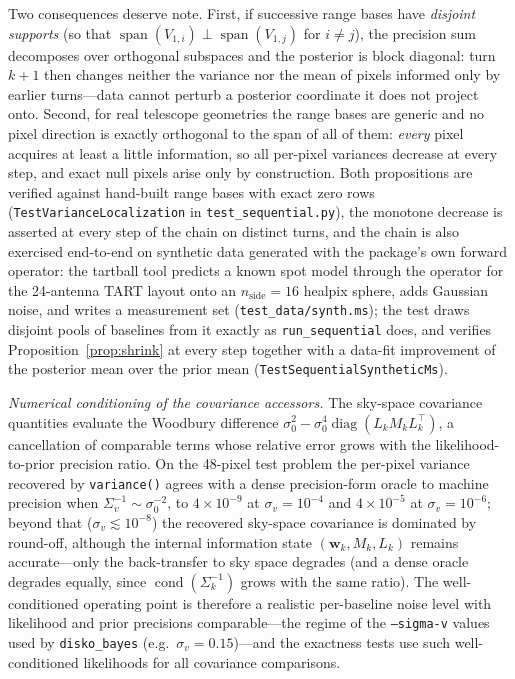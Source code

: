 \documentclass[11pt,a4paper]{article}
\begin{document}
Two consequences deserve note. First, if successive range bases have
\emph{disjoint supports} (so that
$\operatorname{span}(V_{1,i})\perp\operatorname{span}(V_{1,j})$ for $i\neq j$),
the precision sum decomposes over orthogonal subspaces and the posterior is
block diagonal: turn $k+1$ then changes neither the variance nor the mean of
pixels informed only by earlier turns---data cannot perturb a posterior
coordinate it does not project onto. Second, for real telescope geometries the
range bases are generic and no pixel direction is exactly orthogonal to the
span of all of them: \emph{every} pixel acquires at least a little
information, so all per-pixel variances decrease at every step, and exact
null pixels arise only by construction. Both propositions are verified against
hand-built range bases with exact zero rows
(\texttt{TestVarianceLocalization} in \texttt{test\_sequential.py}), the
monotone decrease is asserted at every step of the chain on distinct turns,
and the chain is also exercised end-to-end on synthetic data generated with
the package's own forward operator: the tartball tool \cite{tartball}
predicts a known spot model through the operator for the 24-antenna TART
layout onto an $n_\mathrm{side}=16$ healpix sphere, adds Gaussian noise, and
writes a measurement set (\texttt{test\_data/synth.ms}); the test draws
disjoint pools
of baselines from it exactly as \texttt{run\_sequential} does, and verifies
Proposition~\ref{prop:shrink} at every step together with a data-fit
improvement of the posterior mean over the prior mean
(\texttt{TestSequentialSyntheticMs}).

\emph{Numerical conditioning of the covariance accessors.} The sky-space
covariance quantities evaluate the Woodbury difference
$\sigma_0^2-\sigma_0^4\operatorname{diag}(L_kM_kL_k^{\!\top})$, a
cancellation of comparable terms whose relative error grows with the
likelihood-to-prior precision ratio. On the 48-pixel test problem the
per-pixel variance recovered by \texttt{variance()} agrees with a dense
precision-form oracle to machine precision when
$\Sigma_v^{-1}\sim\sigma_0^{-2}$, to $4\times10^{-9}$ at
$\sigma_v=10^{-4}$ and $4\times10^{-5}$ at $\sigma_v=10^{-6}$; beyond that
($\sigma_v\lesssim10^{-8}$) the recovered sky-space covariance is dominated by
round-off, although the internal information state $(\boldsymbol{w}_k, M_k,
L_k)$ remains accurate---only the back-transfer to sky space degrades (and a
dense oracle degrades equally, since
$\operatorname{cond}(\Sigma_k^{-1})$ grows with the same ratio). The
well-conditioned operating point is therefore a realistic per-baseline noise
level with likelihood and prior precisions comparable---the regime of the
\texttt{--sigma-v} values used by \texttt{disko\_bayes} (e.g.\
$\sigma_v=0.15$)---and the exactness tests use such well-conditioned
likelihoods for all covariance comparisons.
\end{document}

